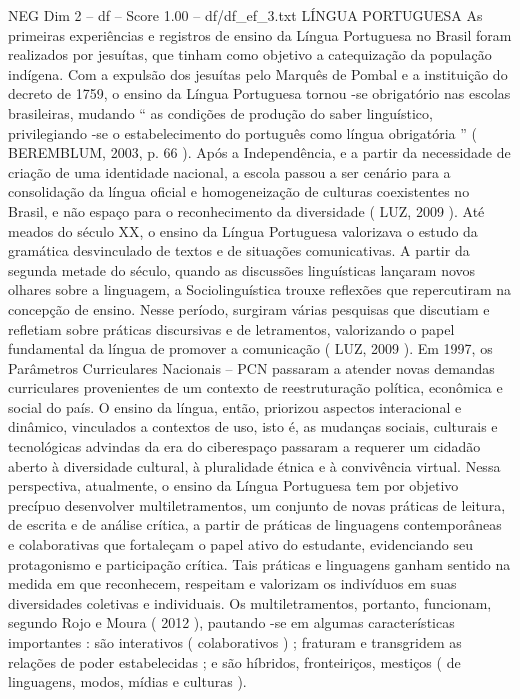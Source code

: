 \begin{textsample}{NEG Dim 2 – df – Score 1.00 – df/df\_ef\_3.txt}  \label{ex:f2_neg_166}
LÍNGUA PORTUGUESA As primeiras experiências e registros de ensino da Língua Portuguesa no Brasil foram realizados por jesuítas, que tinham como objetivo a catequização da população indígena.
Com a expulsão dos jesuítas pelo Marquês de Pombal e a instituição do decreto de 1759, o ensino da Língua Portuguesa tornou -se obrigatório nas escolas brasileiras, mudando “ as condições de produção do saber linguístico, privilegiando -se o estabelecimento do português como língua obrigatória ” ( BEREMBLUM, 2003, p. 66 ).
Após a Independência, e a partir da necessidade de criação de uma identidade nacional, a escola passou a ser cenário para a consolidação da língua oficial e homogeneização de culturas coexistentes no Brasil, e não espaço para o reconhecimento da diversidade ( LUZ, 2009 ).
Até meados do século XX, o ensino da Língua Portuguesa valorizava o estudo da gramática desvinculado de textos e de situações comunicativas.
A partir da segunda metade do século, quando as discussões linguísticas lançaram novos olhares sobre a linguagem, a Sociolinguística trouxe reflexões que repercutiram na concepção de ensino.
Nesse período, surgiram várias pesquisas que discutiam e refletiam sobre práticas discursivas e de letramentos, valorizando o papel fundamental da língua de promover a comunicação ( LUZ, 2009 ).
Em 1997, os Parâmetros Curriculares Nacionais – PCN passaram a atender novas demandas curriculares provenientes de um contexto de reestruturação política, econômica e social do país.
O ensino da língua, então, priorizou aspectos interacional e dinâmico, vinculados a contextos de uso, isto é, as mudanças sociais, culturais e tecnológicas advindas da era do ciberespaço passaram a requerer um cidadão aberto à diversidade cultural, à pluralidade étnica e à convivência virtual.
Nessa perspectiva, atualmente, o ensino da Língua Portuguesa tem por objetivo precípuo desenvolver multiletramentos, um conjunto de novas práticas de leitura, de escrita e de análise crítica, a partir de práticas de linguagens contemporâneas e colaborativas que fortaleçam o papel ativo do estudante, evidenciando seu protagonismo e participação crítica.
Tais práticas e linguagens ganham sentido na medida em que reconhecem, respeitam e valorizam os indivíduos em suas diversidades coletivas e individuais.
Os multiletramentos, portanto, funcionam, segundo Rojo e Moura ( 2012 ), pautando -se em algumas características importantes : são interativos ( colaborativos ) ; fraturam e transgridem as relações de poder estabelecidas ; e são híbridos, fronteiriços, mestiços ( de linguagens, modos, mídias e culturas ).

\end{textsample}
